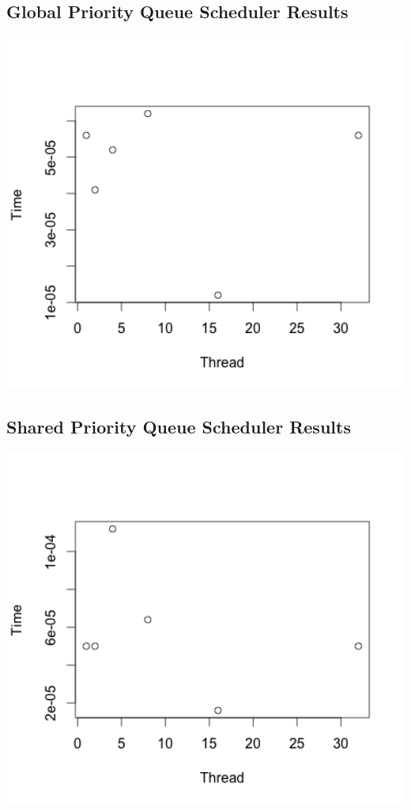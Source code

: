 \documentclass[10pt]{article}
\begin{document}
\subsection{Global Priority Queue Scheduler Results}
\includegraphics[width=1.0\textwidth]{priorityQueue.png}

\subsection{Shared Priority Queue Scheduler Results}
\includegraphics[width=1.0\textwidth]{sharedPriorityQueue.png}

\end{document}
